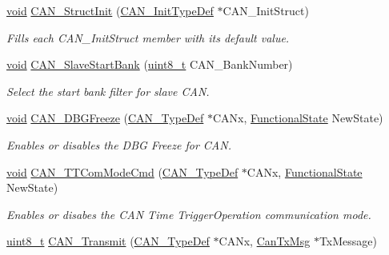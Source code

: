 \begin{DoxyCompactItemize}
\hyperlink{usb__devapi_8h_afabf60e7f57651d6d595a02c75f07cd0}{void} \hyperlink{group___c_a_n___private___functions_gad77ad810868ed111755fc9e8ae0c7646}{C\+A\+N\+\_\+\+Struct\+Init} (\hyperlink{struct_c_a_n___init_type_def}{C\+A\+N\+\_\+\+Init\+Type\+Def} $\ast$C\+A\+N\+\_\+\+Init\+Struct)
\begin{DoxyCompactList}\small\item\em Fills each C\+A\+N\+\_\+\+Init\+Struct member with its default value. \end{DoxyCompactList}\item 
\hyperlink{usb__devapi_8h_afabf60e7f57651d6d595a02c75f07cd0}{void} \hyperlink{group___c_a_n___private___functions_ga109ff8960bc59f44b984c9646f17b3c0}{C\+A\+N\+\_\+\+Slave\+Start\+Bank} (\hyperlink{_p_e___types_8h_aba7bc1797add20fe3efdf37ced1182c5}{uint8\+\_\+t} C\+A\+N\+\_\+\+Bank\+Number)
\begin{DoxyCompactList}\small\item\em Select the start bank filter for slave C\+AN. \end{DoxyCompactList}\item 
\hyperlink{usb__devapi_8h_afabf60e7f57651d6d595a02c75f07cd0}{void} \hyperlink{group___c_a_n___private___functions_gac0e2d33e08caf49d1f1251f0dcc20213}{C\+A\+N\+\_\+\+D\+B\+G\+Freeze} (\hyperlink{struct_c_a_n___type_def}{C\+A\+N\+\_\+\+Type\+Def} $\ast$C\+A\+Nx, \hyperlink{agilefox_2library_2inc_2stm32f10x__type_8h_ac9a7e9a35d2513ec15c3b537aaa4fba1}{Functional\+State} New\+State)
\begin{DoxyCompactList}\small\item\em Enables or disables the D\+BG Freeze for C\+AN. \end{DoxyCompactList}\item 
\hyperlink{usb__devapi_8h_afabf60e7f57651d6d595a02c75f07cd0}{void} \hyperlink{group___c_a_n___private___functions_ga94740177bab153ca5b102d122f9a8cca}{C\+A\+N\+\_\+\+T\+T\+Com\+Mode\+Cmd} (\hyperlink{struct_c_a_n___type_def}{C\+A\+N\+\_\+\+Type\+Def} $\ast$C\+A\+Nx, \hyperlink{agilefox_2library_2inc_2stm32f10x__type_8h_ac9a7e9a35d2513ec15c3b537aaa4fba1}{Functional\+State} New\+State)
\begin{DoxyCompactList}\small\item\em Enables or disabes the C\+AN Time Trigger\+Operation communication mode. \end{DoxyCompactList}\item 
\hyperlink{_p_e___types_8h_aba7bc1797add20fe3efdf37ced1182c5}{uint8\+\_\+t} \hyperlink{group___c_a_n___private___functions_gaccfcb81f76f58400077c7b2d8641dd83}{C\+A\+N\+\_\+\+Transmit} (\hyperlink{struct_c_a_n___type_def}{C\+A\+N\+\_\+\+Type\+Def} $\ast$C\+A\+Nx, \hyperlink{struct_can_tx_msg}{Can\+Tx\+Msg} $\ast$Tx\+Message)

\end{DoxyCompactItemize}
